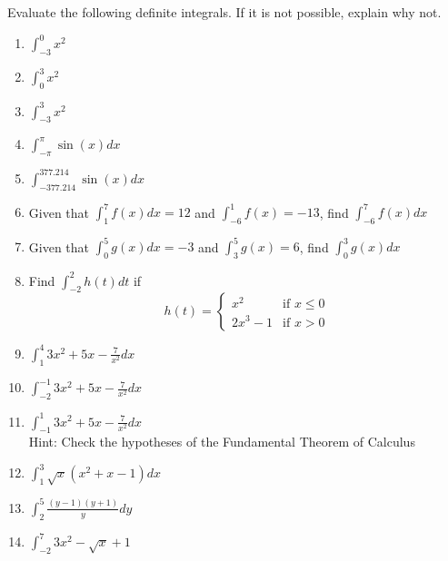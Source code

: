\documentclass{article}
\begin{document}
Evaluate the following definite integrals. If it is not possible, explain why not.
\Large
\begin{enumerate}
\item $\int_{-3}^0 x^2$
\item $\int_{0}^3 x^2$
\item $\int_{-3}^3 x^2$
\item $\int_{-\pi}^\pi \sin(x) dx$
\item $\int_{-377.214}^{377.214} \sin(x) dx$
\item Given that $\int_1^7 f(x)dx = 12$ and $\int_{-6}^1 f(x) = -13$, find $\int_{-6}^7 f(x) dx$
\item Given that $\int_0^5 g(x)dx = -3$ and $\int_{3}^5 g(x) =  6$, find $\int_0^3 g(x) dx$
\item Find $\int_{-2}^2 h(t) dt$ if 
$$h(t) = \left\{\begin{array}{cc} x^2 &\mbox{if } x\leq 0\\ 2x^3 -1 &\mbox{if } x >0\end{array}\right.$$
\item $\int_1^4 3x^2 + 5x -\frac{7}{x^2} dx$
\item $\int_{-2}^{-1} 3x^2 + 5x -\frac{7}{x^2} dx$
\item $\int_{-1}^1 3x^2 + 5x -\frac{7}{x^2} dx$\\ Hint: Check the hypotheses of the Fundamental Theorem of Calculus
\item $\int_1^3 \sqrt{x}(x^2 + x -1) dx$
\item $\int_2^5 \frac{(y-1)(y+1)}{y} dy$
\item $\int_{-2}^7 3x^2 - \sqrt{x} + 1$
\end{enumerate}
\end{document}

